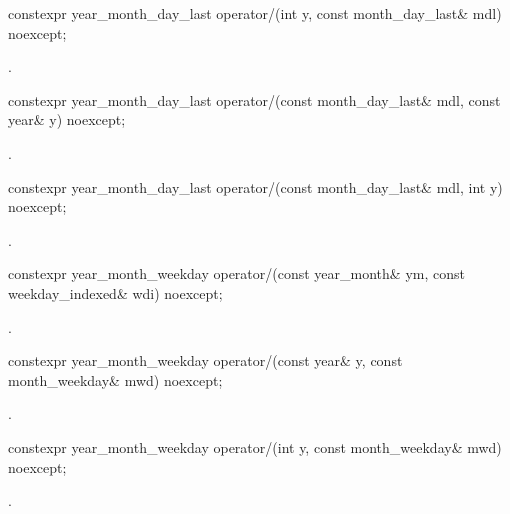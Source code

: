 \begin{itemdecl}
constexpr year_month_day_last
  operator/(int y, const month_day_last& mdl) noexcept;
\end{itemdecl}

\begin{itemdescr}
\pnum
\returns
{}.
\end{itemdescr}

\begin{itemdecl}
constexpr year_month_day_last
  operator/(const month_day_last& mdl, const year& y) noexcept;
\end{itemdecl}

\begin{itemdescr}
\pnum
\returns
{}.
\end{itemdescr}

\begin{itemdecl}
constexpr year_month_day_last
  operator/(const month_day_last& mdl, int y) noexcept;
\end{itemdecl}

\begin{itemdescr}
\pnum
\returns
{}.
\end{itemdescr}

\begin{itemdecl}
constexpr year_month_weekday
  operator/(const year_month& ym, const weekday_indexed& wdi) noexcept;
\end{itemdecl}

\begin{itemdescr}
\pnum
\returns
{}.
\end{itemdescr}

\begin{itemdecl}
constexpr year_month_weekday
  operator/(const year& y, const month_weekday& mwd) noexcept;
\end{itemdecl}

\begin{itemdescr}
\pnum
\returns
{}.
\end{itemdescr}

\begin{itemdecl}
constexpr year_month_weekday
  operator/(int y, const month_weekday& mwd) noexcept;
\end{itemdecl}

\begin{itemdescr}
\pnum
\returns
{}.
\end{itemdescr}

